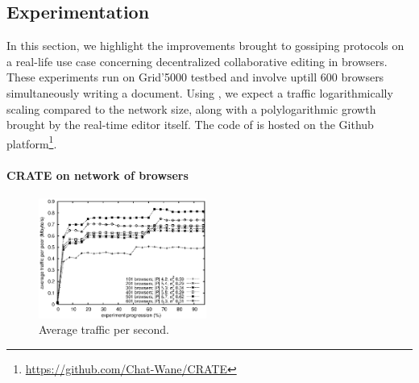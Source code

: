 
\subsection{Experimentation}
\label{subsec:experiments2}

In this section, we highlight the improvements brought to gossiping protocols on
a real-life use case concerning decentralized collaborative editing in browsers.
These experiments run on Grid'5000 testbed and involve uptill 600 browsers
simultaneously writing a document. Using \SPRAY, we expect a traffic
logarithmically scaling compared to the network size, along with a
polylogarithmic growth brought by the real-time editor itself. The code of
\CRATE is hosted on the Github
platform\footnote{\url{https://github.com/Chat-Wane/CRATE}}.

\vspace{-7pt}
\paragraph{CRATE on network of browsers}

\begin{figure}
  \centering
  \includegraphics[width=0.49\textwidth]{img/traffic.eps}
  \caption{\label{fig:traffic}Average traffic per second.}
\end{figure}


